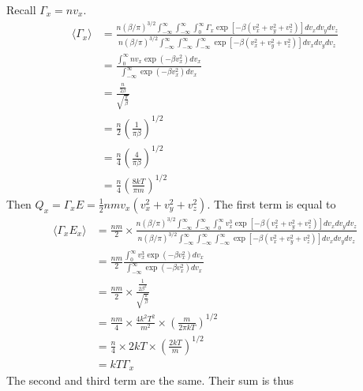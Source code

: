 \documentclass[answers]{exam}
\begin{document}
\begin{questions}
\begin{solution}
    Recall $\Gamma_x = nv_x$.
    \begin{align*}
        \langle \Gamma_x \rangle &= \frac{n(\beta/\pi)^{3/2}\int_{-\infty}^\infty \int_{-\infty}^\infty \int_0^\infty \Gamma_x \exp\left[-\beta\left(v_x^2+v_y^2+v_z^2\right)\right]dv_xdv_ydv_z}{n(\beta/\pi)^{3/2}\int_{-\infty}^\infty \int_{-\infty}^\infty \int_{-\infty}^\infty \exp\left[-\beta\left(v_x^2+v_y^2+v_z^2\right)\right]dv_xdv_ydv_z} \\
                                 &= \frac{\int_0^\infty nv_x\exp\left(-\beta v_x^2\right)dv_x}{\int_{-\infty}^\infty \exp\left(-\beta v_x^2\right)dv_x} \\
                                 &= \frac{\frac{n}{2\beta}}{\sqrt{\frac{\pi}{\beta}}} \\
                                 &= \frac{n}{2}\left(\frac{1}{\pi\beta}\right)^{1/2} \\
                                 &= \frac{n}{4}\left(\frac{4}{\pi\beta}\right)^{1/2} \\
                                 &= \frac{n}{4}\left(\frac{8kT}{\pi m}\right)^{1/2}
    \end{align*}
    Then $Q_x = \Gamma_xE = \frac{1}{2}nmv_x(v_x^2+v_y^2+v_z^2)$. The first term is equal to
    \begin{align*}
        \langle \Gamma_xE_x \rangle &= \frac{nm}{2} \times \frac{n(\beta/\pi)^{3/2}\int_{-\infty}^\infty \int_{-\infty}^\infty \int_0^\infty v_x^3\exp\left[-\beta\left(v_x^2+v_y^2+v_z^2\right)\right]dv_xdv_ydv_z}{n(\beta/\pi)^{3/2} \int_{-\infty}^\infty \int_{-\infty}^\infty \int_{-\infty}^\infty \exp\left[-\beta\left(v_x^2+v_y^2+v_z^2\right)\right]dv_xdv_ydv_z} \\
                            &= \frac{nm}{2} \frac{\int_0^\infty v_x^3\exp\left(-\beta v_x^2\right)dv_x}{\int_{-\infty}^\infty \exp\left(-\beta v_x^2\right)dv_x} \\
                            &= \frac{nm}{2} \times \frac{\frac{1}{2\beta^2}}{\sqrt{\frac{\pi}{\beta}}} \\
                            &= \frac{nm}{4} \times \frac{4k^2T^2}{m^2} \times \left(\frac{m}{2\pi kT}\right)^{1/2} \\
                            &= \frac{n}{4} \times 2kT \times \left(\frac{2kT}{m}\right)^{1/2} \\
                            &= kT\Gamma_x
    \end{align*}
    The second and third term are the same. Their sum is thus

\end{solution}
\end{questions}
\end{document}
